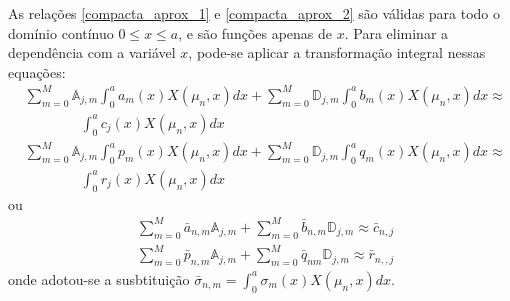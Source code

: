 As relações \eqref{compacta_aprox_1} e \eqref{compacta_aprox_2} são válidas para todo o domínio contínuo $0 \le x \le a$, e são funções apenas de $x$. Para eliminar a dependência com a variável $x$, pode-se aplicar a transformação integral nessas equações:
\begin{align}
& \sum_{m = 0}^M \mathbb{A}_{j,m}\int_0^a a_m(x)X(\mu_n, x)dx + \sum_{m = 0}^M \mathbb{D}_{j,m} \int_0^a b_m(x)X(\mu_n, x)dx \approx \nonumber \\ 
& \quad\quad\quad\quad\int_0^a c_{j}(x)X(\mu_n, x)dx \label{compacta_aprox_1_integr}
\end{align}
\begin{align}
& \sum_{m = 0}^M \mathbb{A}_{j,m}\int_0^a p_m(x)X(\mu_n, x)dx + \sum_{m = 0}^M \mathbb{D}_{j,m} \int_0^a q_m(x)X(\mu_n, x)dx \approx \nonumber \\ 
& \quad\quad\quad\quad\int_0^a r_{j}(x)X(\mu_n, x)dx  \label{compacta_aprox_2_integr}
\end{align}
ou
\begin{align}
& \sum_{m = 0}^M \bar{a}_{n,m} \mathbb{A}_{j,m} + \sum_{m = 0}^M \bar{b}_{n,m} \mathbb{D}_{j,m} \approx \bar{c}_{n,j} \label{sistema_para_coeficientes_1}
\\
& \sum_{m = 0}^M \bar{p}_{n,m} \mathbb{A}_{j,m} + \sum_{m = 0}^M \bar{q}_{nm} \mathbb{D}_{j,m} \approx \bar{r}_{n,,j} \label{sistema_para_coeficientes_2}
\end{align}
onde adotou-se a susbtituição $\bar{\sigma}_{n,m} = \displaystyle \int_0^a \sigma_m(x)X(\mu_n, x)dx$.
\\


